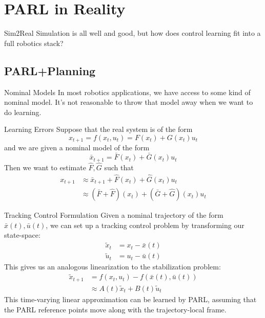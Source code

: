 \documentclass{beamer}
\begin{document}
\section{PARL in Reality}

\begin{frame}{Sim2Real}
  Simulation is all well and good, but how does control learning fit into a
  full robotics stack?
\end{frame}

\subsection{PARL+Planning}

\begin{frame}{Nominal Models}
  In most robotics applications, we have access to some kind of nominal model.
  It's not reasonable to throw that model away when we want to do learning.
\end{frame}

\begin{frame}{Learning Errors}
  Suppose that the real system is of the form
  \begin{equation*}
    x_{t+1} = f(x_t, u_t) = F(x_t) + G(x_t)u_t
  \end{equation*}
  and we are given a nominal model of the form 
  \begin{equation*}
    \bar{x}_{t+1} = \bar{F}(x_t) + \bar{G}(x_t)u_t
  \end{equation*}
  Then we want to estimate $\hat{F}, \hat{G}$ such that 
  \begin{align*}
    x_{t+1} &\approx \bar{x}_{t+1} + \hat{F}(x_t) + \hat{G}(x_t)u_t \\
    &\approx \left(\bar{F} + \hat{F}\right)(x_t) + \left(\bar{G} + \hat{G}\right)(x_t)u_t
  \end{align*}
\end{frame}

\begin{frame}{Tracking Control Formulation}
  Given a nominal trajectory of the form $\bar{x}(t), \bar{u}(t)$, we can set
  up a tracking control problem by transforming our state-space:
  \begin{align*}
    \tilde{x}_t &= x_t - \bar{x}(t) \\
    \tilde{u}_t &= u_t - \bar{u}(t)
  \end{align*}
  This gives us an analogous linearization to the stabilization problem:
  \begin{align*}
    \tilde{x}_{t+1} &= f(x_t, u_t) - f(\bar{x}(t), \bar{u}(t)) \\
                    &\approx A(t)\tilde{x}_t + B(t)\tilde{u}_t
  \end{align*}
  This time-varying linear approximation can be learned by PARL, assuming that
  the PARL reference points move along with the trajectory-local frame.
\end{frame}
\end{document}
